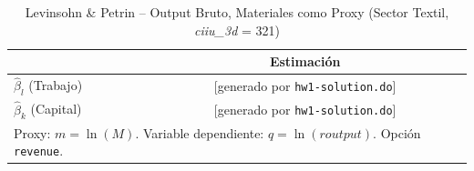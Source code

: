 \begin{table}[H]
\centering
\caption{Levinsohn \& Petrin -- Output Bruto, Materiales como Proxy (Sector Textil, \textit{ciiu\_3d} = 321)}
\begin{tabular}{lc}
\toprule
 & Estimación \\
\midrule
$\hat{\beta}_l$ (Trabajo) & [generado por \texttt{hw1-solution.do}] \\
$\hat{\beta}_k$ (Capital) & [generado por \texttt{hw1-solution.do}] \\
\bottomrule
\multicolumn{2}{l}{\small Proxy: $m = \ln(M)$. Variable dependiente: $q = \ln(\mathit{routput})$. Opción \texttt{revenue}.}
\end{tabular}
\end{table}
